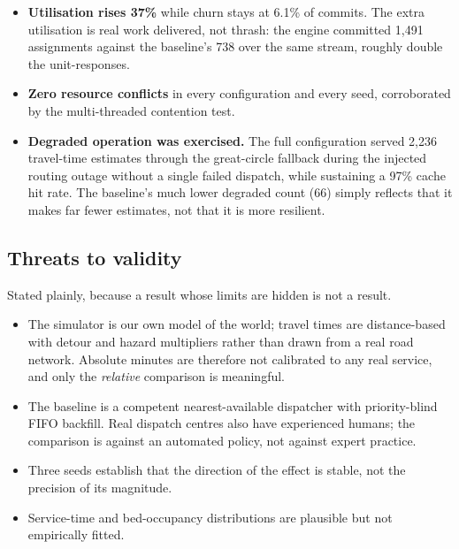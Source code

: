 \begin{itemize}
\item \textbf{Utilisation rises 37\%} while churn stays at 6.1\% of commits.
      The extra utilisation is real work delivered, not thrash: the engine
      committed 1{,}491 assignments against the baseline's 738 over the same
      stream, roughly double the unit-responses.

\item \textbf{Zero resource conflicts} in every configuration and every seed,
      corroborated by the multi-threaded contention test.

\item \textbf{Degraded operation was exercised.} The full configuration served
      2{,}236 travel-time estimates through the great-circle fallback during
      the injected routing outage without a single failed dispatch, while
      sustaining a 97\% cache hit rate. The baseline's much lower degraded
      count (66) simply reflects that it makes far fewer estimates, not that
      it is more resilient.
\end{itemize}

\subsection{Threats to validity}

Stated plainly, because a result whose limits are hidden is not a result.

\begin{itemize}
\item The simulator is our own model of the world; travel times are
      distance-based with detour and hazard multipliers rather than drawn from
      a real road network. Absolute minutes are therefore not calibrated to
      any real service, and only the \emph{relative} comparison is meaningful.
\item The baseline is a competent nearest-available dispatcher with
      priority-blind FIFO backfill. Real dispatch centres also have
      experienced humans; the comparison is against an automated policy, not
      against expert practice.
\item Three seeds establish that the direction of the effect is stable, not
      the precision of its magnitude.
\item Service-time and bed-occupancy distributions are plausible but not
      empirically fitted.
\end{itemize}

